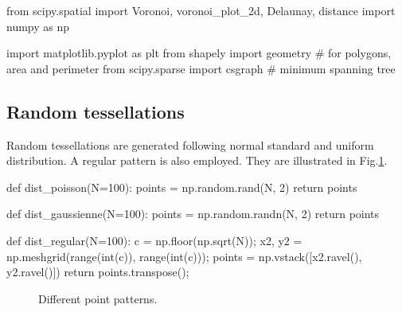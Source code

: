 \def\QRCODE{TB_IPR_TUT.IMG.point_processes_voronoi_pythonqrcode.png}
\def\QRPAGE{http://www.iptutorials.science/tree/master/TB_IPR/TUT.IMG.point_processes_voronoi/python}


\begin{python}
from scipy.spatial import Voronoi, voronoi_plot_2d, Delaunay, distance
import numpy as np

import matplotlib.pyplot as plt
from shapely import geometry # for polygons, area and perimeter
from  scipy.sparse import csgraph # minimum spanning tree
\end{python}

\subsection{Random tessellations}
Random tessellations are generated following normal standard and uniform distribution. A regular pattern is also employed. They are illustrated in Fig.\ref{fig:point_processes_voronoi:python:patterns}.

\begin{python}
def dist_poisson(N=100):
    points = np.random.rand(N, 2)
    return points

def dist_gaussienne(N=100):
    points = np.random.randn(N, 2)
    return points

def dist_regular(N=100):
    c = np.floor(np.sqrt(N));
    x2, y2 = np.meshgrid(range(int(c)), range(int(c)));
    points = np.vstack([x2.ravel(), y2.ravel()])
    return points.transpose();
\end{python}

\begin{figure}[H]
 \centering\caption{Different point patterns.}%
 \hfill
 \hfill
 \label{fig:point_processes_voronoi:python:patterns}%
\end{figure}

